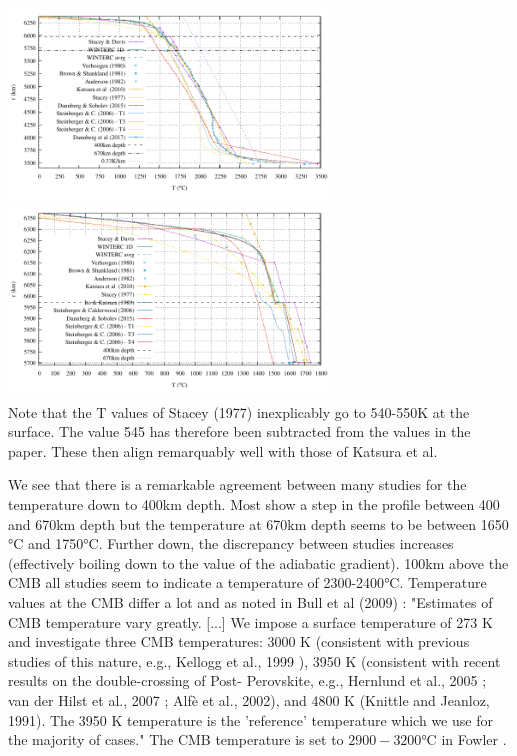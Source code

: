 \begin{center}
\includegraphics[width=8.5cm]{images/adiabatic/Tprofile.pdf}
\includegraphics[width=8.5cm]{images/adiabatic/Tprofile_upper.pdf}\\
{\captionfont 
Note that the T values of Stacey (1977) \cite{stac77} inexplicably go to 540-550K at the surface. 
The value 545 has therefore been subtracted from the values in the paper. These then 
align remarquably well with those of Katsura et al.
}
\end{center}




We see that there is a remarkable agreement between many studies for the temperature down to 400km 
depth. Most show a step in the profile between 400 and 670km depth but the temperature at 670km
depth seems to be between 1650$\si{\celsius}$ and 1750$\si{\celsius}$.
Further down, the discrepancy between studies increases (effectively boiling down to 
the value of the adiabatic gradient). 100km above the CMB all studies seem to indicate a 
temperature of 2300-2400$\si{\celsius}$. Temperature values at the CMB differ a lot and 
as noted in Bull et al (2009) \cite{bumr09}: 
"Estimates of CMB temperature vary greatly. [...] 
We impose a surface temperature of 273 K and
investigate three CMB temperatures: 3000 K (consistent with
previous studies of this nature, e.g., Kellogg et al., 1999 \cite{kehv99}), 3950 K
(consistent with recent results on the double-crossing of Post-
Perovskite, e.g., Hernlund et al., 2005 \cite{hett05}; van der Hilst et al., 
2007 \cite{vadw07}; Alf\`e et al., 2002), and 4800 K (Knittle and Jeanloz, 1991). The 3950 K
temperature is the 'reference' temperature which we use for the
majority of cases."
The CMB temperature is set to $2900-3200\si{\celsius}$ in Fowler \cite{fowler}.


